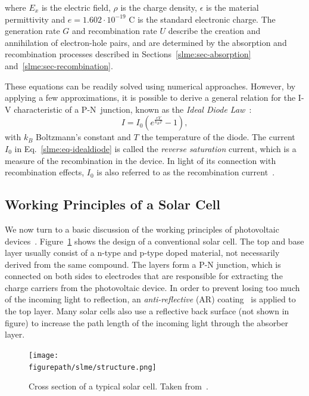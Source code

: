 \begin{refsection}
\begin{enumerate}
\end{enumerate} 
where $E_x$ is the electric field, $\rho$ is the charge density, $\epsilon$ is 
the material permittivity and $e = 1.602\cdot 10^{-19}$ \si{\coulomb} is the standard 
electronic charge. The generation rate $G$ and recombination rate $U$ describe 
the creation and annihilation of electron-hole pairs, and are determined by 
the absorption and recombination processes described in 
Sections~\ref{slme:sec-absorption} and~\ref{slme:sec-recombination}.  
 
These equations can be readily solved using numerical approaches. However, by 
applying a few approximations, it is possible to derive a general relation for 
the I-V characteristic of a P-N~junction, known as the \textit{Ideal Diode 
Law}~\cite{Shockley1949}: 
\begin{equation}\label{slme:eq-idealdiode} 
I = I_0 (e^\frac{e V}{k_B T} - 1), 
\end{equation} 
with $k_B$ Boltzmann's constant and $T$ the temperature of the diode. The 
current $I_0$ in Eq.~\ref{slme:eq-idealdiode} is called the \textit{reverse 
saturation} current, which is a measure of the recombination in the device. In 
light of its connection with recombination effects, $I_0$ is also referred to 
as the recombination current~\cite{Cuevas2014}. 
 
\subsection{Working Principles of a Solar Cell} 
 
We now turn to a basic discussion of the working principles of photovoltaic 
devices~\cite{Fonash2010}. Figure~\ref{slme:fig-solarcell} shows the design of 
a conventional solar cell. The top and base layer usually consist of a n-type 
and p-type doped material, not necessarily derived from the same compound. The 
layers form a P-N junction, which is connected on both sides to electrodes 
that are responsible for extracting the charge carriers from the photovoltaic 
device. In order to prevent losing too much of the incoming light to 
reflection, an \textit{anti-reflective} (AR) coating~\cite{Swatowska2011} is 
applied to the top layer. Many solar cells also use a reflective back surface 
(not shown in figure) to increase the path length of the incoming light 
through the absorber layer. 
 
\begin{figure}[ht]  
\centering 
\captionsetup{width=0.8\textwidth}
\texttt{[image: \\figurepath/slme/structure.png]} 
\caption{\label{slme:fig-solarcell} Cross section of a typical solar cell. 
Taken from~\cite{Fonash2010}.} 
\end{figure} 


\end{refsection}
